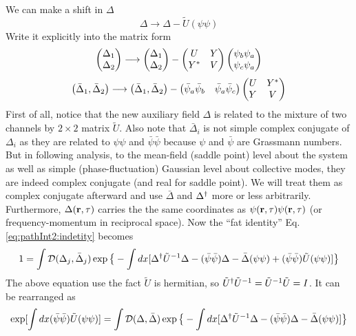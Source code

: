We can make a shift in $\Delta$
\begin{equation}
\Delta\longrightarrow\Delta-\tilde{U}(\psi\psi)
\end{equation}
Write it explicitly into the matrix form
\begin{equation*}
\begin{pmatrix}\Delta_{1}\\\Delta_{2}\end{pmatrix}\longrightarrow
	\begin{pmatrix}\Delta_{1}\\\Delta_{2}\end{pmatrix}-
	\begin{pmatrix}U&Y\\Y^{*}&V\end{pmatrix}
	\begin{pmatrix}\psi_{b}\psi_{a}\\\psi_{c}\psi_{a}\end{pmatrix}
\end{equation*}
\begin{equation*}
\begin{pmatrix}\bar\Delta_{1},\bar\Delta_{2}\end{pmatrix}\longrightarrow
	\begin{pmatrix}\bar\Delta_{1},\bar\Delta_{2}\end{pmatrix}-
	\begin{pmatrix}\bar\psi_{a}\bar\psi_{b}&\bar\psi_{a}\bar\psi_{c}\end{pmatrix}
	\begin{pmatrix}U&Y^{*}\\Y^{}&V\end{pmatrix}
\end{equation*}
First of all, notice that the new auxiliary field $\Delta$ is related to the mixture of two channels by $2\times2$ matrix $\tilde{U}$.
Also note that  $\bar{\Delta}_{i}$ is not simple complex conjugate of $\Delta_{i}$ as they are related to $\psi\psi$ and $\bar\psi\bar\psi$ because $\psi$ and $\bar\psi$ are Grassmann numbers. But in following analysis, to the  mean-field (saddle point) level about the system as well as simple  (phase-fluctuation) Gaussian level about collective modes, they are indeed complex conjugate (and real for saddle point).  We will treat them as complex conjugate afterward and use $\bar\Delta$ and $\Delta^{\dagger}$ more or less arbitrarily.  Furthermore, $\Delta(\mathbf{r},\tau)$ carries the the same coordinates as $\psi(\mathbf{r},\tau)\psi(\mathbf{r},\tau)$ (or frequency-momentum in reciprocal space).  Now the ``fat identity'' Eq. \ref{eq:pathInt2:indetity} becomes 
\begin{equation}
1=\int{\ensuremath{\mathcal{D}}(\Delta_{j},\bar\Delta_{j})}\exp\big\{-\int{dx}
	[\Delta^{\dagger}\tilde{U}^{-1}\Delta-(\bar\psi\bar\psi)\Delta-\bar\Delta(\psi\psi)+(\bar\psi\bar\psi)\tilde{U}(\psi\psi)]\big\}
\end{equation}
The above equation use the fact $\tilde{U}$ is hermitian, so $\tilde{U}^{\dagger}\tilde{U}^{-1}=\tilde{U}^{-1}\tilde{U}=I$.
It can be rearranged as 
\begin{equation}
\exp[\int{dx}(\bar\psi\bar\psi)\tilde{U}(\psi\psi)]
=\int{\ensuremath{\mathcal{D}}(\Delta,\bar\Delta)}\exp\big\{-\int{dx}
	[\Delta^{\dagger}\tilde{U}^{-1}\Delta-(\bar\psi\bar\psi)\Delta-\bar\Delta{}(\psi\psi)]\big\}
\end{equation}
